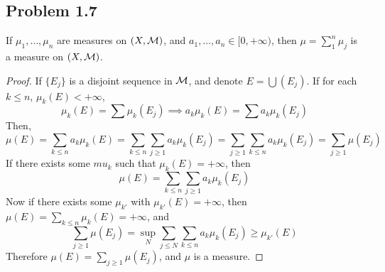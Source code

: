 \documentclass[../../main.tex]{subfiles}
\begin{document}
\newpage\subsection*{Problem 1.7}
\begin{wts}
    If $\mu_1,\ldots,\mu_n$ are measures on $(X,\mathcal{M})$, and $a_1,\ldots, a_n\in[0,+\infty)$, then $\mu = \sum^n_1\mu_j$ is a measure on $(X,\mathcal{M})$.
\end{wts}
\begin{proof}
    If $\{E_j\}$ is a disjoint sequence in $\mathcal{M}$, and denote $E = \bigcup (E_j)$. If for each $k\leq n$, $\mu_k(E)<+\infty$, 
    \[
    \mu_k(E)=\sum \mu_k(E_j)\implies a_k\mu_k(E)=\sum a_k\mu_k(E_j)
    \]
    Then,
    \[
    \mu(E)=\sum_{k\leq n}a_k\mu_k(E)= \sum_{k\leq n}\sum_{j\geq 1}a_k\mu_k(E_j)=\sum_{j\geq 1}\sum_{k\leq n}a_k\mu_k(E_j)=\sum_{j\geq 1}\mu(E_j)
    \]
    If there exists some $mu_k$ such that $\mu_k(E) = +\infty$, then 
    \[
    \mu(E) = \sum_{k\leq n}\sum_{j\geq 1}a_k\mu_k(E_j)
    \]
    Now if there exists some $\mu_{k'}$ with $\mu_{k'}(E)=+\infty$, then $\mu(E)=\sum_{k\leq n}\mu_k(E)=+\infty$, and 
    \[
    \sum_{j\geq 1}\mu(E_j)=\sup_N\sum_{j\leq N} \sum_{k\leq n}a_k\mu_k(E_j)\geq \mu_{k'}(E)
    \]
    Therefore $\mu(E)=\sum_{j\geq 1}\mu(E_j)$, and $\mu$ is a measure.
\end{proof}
\end{document}
